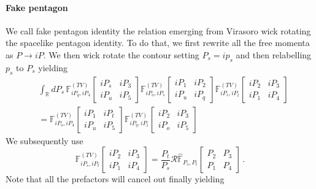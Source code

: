 \documentclass[11pt]{article}
\begin{document}
\paragraph{Fake pentagon}
We call fake pentagon identity the relation emerging from Virasoro wick rotating the spacelike pentagon identity. To do that, we first rewrite all the free momenta as $P \to iP$. We then wick rotate the contour setting $P_s = i p_s$ and then relabelling $p_s$ to $P_s$ yielding
\begin{equation}\label{eq:fakepentagon}
\begin{aligned}
    &\int_{\mathbb{R}} dP_s \, \mathbb{F}^{(TV)}_{iP_q, iP_4} 
   \begin{bmatrix}
    iP_s & iP_3 \\
    iP_u & iP_5
\end{bmatrix}
\mathbb{F}^{(TV)}_{iP_o, iP_s} 
   \begin{bmatrix}
    iP_1 & iP_2 \\
    iP_u & iP_q
\end{bmatrix}
\mathbb{F}^{(TV)}_{iP_s, iP_t} 
   \begin{bmatrix}
    iP_2 & iP_3 \\
    iP_1 & iP_4
\end{bmatrix}\\
&= \mathbb{F}^{(TV)}_{iP_o, iP_4} 
   \begin{bmatrix}
    iP_1 & iP_t \\
    iP_u & iP_5
\end{bmatrix}
\mathbb{F}^{(TV)}_{iP_q, iP_t} 
   \begin{bmatrix}
    iP_2 & iP_3 \\
    iP_o & iP_5
\end{bmatrix}
\end{aligned}
\end{equation}
We subsequently use
\begin{equation}
    \mathbb{F}^{(TV)}_{iP_s, iP_t} 
   \begin{bmatrix}
    iP_2 & iP_3 \\
    iP_1 & iP_4
\end{bmatrix} = \frac{P_t}{P_s}\mathcal{R}\hat{\mathbb{F}}_{P_s,P_t}\begin{bmatrix}
        P_2 & P_3 \\
        P_1 & P_4
    \end{bmatrix}\,.
\end{equation}
Note that all the prefactors will cancel out finally yielding
\end{document}

